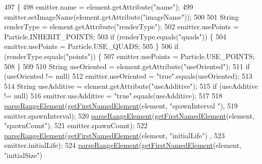 \begin{DoxyCode}
497                                          \{
498         emitter.name = element.getAttribute(\textcolor{stringliteral}{"name"});
499         emitter.setImageName(element.getAttribute(\textcolor{stringliteral}{"imageName"}));
500 
501         String renderType = element.getAttribute(\textcolor{stringliteral}{"renderType"});
502         emitter.usePoints = Particle.INHERIT\_POINTS;
503         \textcolor{keywordflow}{if} (renderType.equals(\textcolor{stringliteral}{"quads"})) \{
504             emitter.usePoints = Particle.USE\_QUADS;
505         \}
506         \textcolor{keywordflow}{if} (renderType.equals(\textcolor{stringliteral}{"points"})) \{
507             emitter.usePoints = Particle.USE\_POINTS;
508         \}
509 
510         String useOriented = element.getAttribute(\textcolor{stringliteral}{"useOriented"});
511         \textcolor{keywordflow}{if} (useOriented != null)
512             emitter.useOriented = \textcolor{stringliteral}{"true"}.equals(useOriented);
513 
514         String useAdditive = element.getAttribute(\textcolor{stringliteral}{"useAdditive"});
515         \textcolor{keywordflow}{if} (useAdditive != null)
516             emitter.useAdditive = \textcolor{stringliteral}{"true"}.equals(useAdditive);
517 
518         \mbox{\hyperlink{classorg_1_1newdawn_1_1slick_1_1particles_1_1_particle_i_o_a99f79efdbfa98c3d6c2fff816ed9c312}{parseRangeElement}}(\mbox{\hyperlink{classorg_1_1newdawn_1_1slick_1_1particles_1_1_particle_i_o_a84405f6266ad1512ddbd9939dd73e02f}{getFirstNamedElement}}(element, \textcolor{stringliteral}{"spawnInterval
      "}),
519                 emitter.spawnInterval);
520         \mbox{\hyperlink{classorg_1_1newdawn_1_1slick_1_1particles_1_1_particle_i_o_a99f79efdbfa98c3d6c2fff816ed9c312}{parseRangeElement}}(\mbox{\hyperlink{classorg_1_1newdawn_1_1slick_1_1particles_1_1_particle_i_o_a84405f6266ad1512ddbd9939dd73e02f}{getFirstNamedElement}}(element, \textcolor{stringliteral}{"spawnCount"}),
521                 emitter.spawnCount);
522         \mbox{\hyperlink{classorg_1_1newdawn_1_1slick_1_1particles_1_1_particle_i_o_a99f79efdbfa98c3d6c2fff816ed9c312}{parseRangeElement}}(\mbox{\hyperlink{classorg_1_1newdawn_1_1slick_1_1particles_1_1_particle_i_o_a84405f6266ad1512ddbd9939dd73e02f}{getFirstNamedElement}}(element, \textcolor{stringliteral}{"initialLife"})
      ,
523                 emitter.initialLife);
524         \mbox{\hyperlink{classorg_1_1newdawn_1_1slick_1_1particles_1_1_particle_i_o_a99f79efdbfa98c3d6c2fff816ed9c312}{parseRangeElement}}(\mbox{\hyperlink{classorg_1_1newdawn_1_1slick_1_1particles_1_1_particle_i_o_a84405f6266ad1512ddbd9939dd73e02f}{getFirstNamedElement}}(element, \textcolor{stringliteral}{"initialSize"})

\end{DoxyCode}
